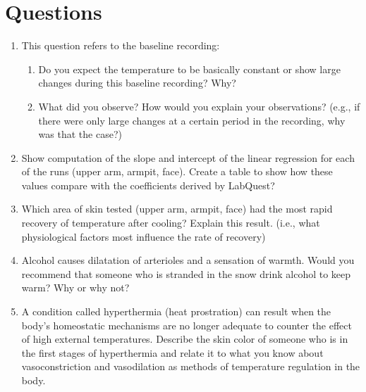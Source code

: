 \documentclass[12pt,oneside]{article}
\begin{document}
\section{Questions}
\begin{enumerate}
\item   This question refers to the baseline recording:
\begin{enumerate}
\item   Do you expect the temperature to be basically constant or show large changes during this baseline recording?  Why?
\item   What did you observe?  How would you explain your observations? (e.g., if there were only large changes at a certain period in the recording, why was that the case?)
\end{enumerate}
\item   Show computation of the slope and intercept of the linear regression for each of the runs (upper arm, armpit, face).  Create a table to show how these values compare with the coefficients derived by LabQuest?
\item   Which area of skin tested (upper arm, armpit, face) had the most rapid recovery of temperature after cooling? Explain this result. (i.e., what physiological factors most influence the rate of recovery)
\item   Alcohol causes dilatation of arterioles and a sensation of warmth. Would you recommend that someone who is stranded in the snow drink alcohol to keep warm? Why or why not?
\item   A condition called hyperthermia (heat prostration) can result when the body’s homeostatic mechanisms are no longer adequate to counter the effect of high external temperatures. Describe the skin color of someone who is in the first stages of hyperthermia and relate it to what you know about vasoconstriction and vasodilation as methods of temperature regulation in the body.
\end{enumerate}
\end{document}
